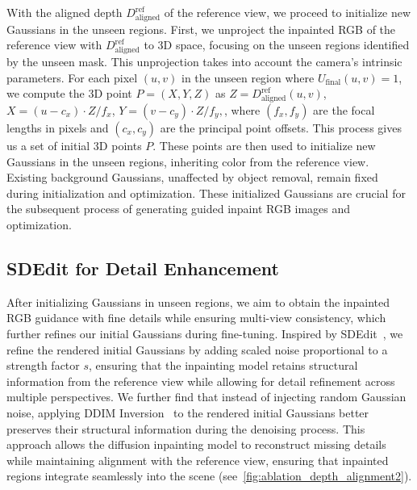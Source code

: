 \vspace{2pt}
With the aligned depth $D_\text{aligned}^{\text{ref}}$ of the reference view, we proceed to initialize new Gaussians in the unseen regions. First, we unproject the inpainted RGB of the reference view with $D_\text{aligned}^\text{ref}$ to 3D space, focusing on the unseen regions identified by the unseen mask. This unprojection takes into account the camera's intrinsic parameters. For each pixel $(u, v)$ in the unseen region where $U_\text{final}(u, v) = 1$, we compute the 3D point $P = (X, Y, Z)$ as $Z = D_\text{aligned}^\text{ref}(u, v)$, $X = (u - c_x) \cdot Z / f_x$, $Y = (v - c_y) \cdot Z / f_y,$,
where $(f_x, f_y)$ are the focal lengths in pixels and $(c_x, c_y)$ are the principal point offsets. This process gives us a set of initial 3D points $P$. These points are then used to initialize new Gaussians in the unseen regions, inheriting color from the reference view. Existing background Gaussians, unaffected by object removal, remain fixed during initialization and optimization. These initialized Gaussians are crucial for the subsequent process of generating guided inpaint RGB images and optimization.



\subsection{SDEdit for Detail Enhancement}  
\label{sec:sdedit}  

After initializing Gaussians in unseen regions, we aim to obtain the inpainted RGB guidance with fine details while ensuring multi-view consistency, which further refines our initial Gaussians during fine-tuning. Inspired by SDEdit~\citep{meng2022sdedit}, we refine the rendered initial Gaussians by adding scaled noise proportional to a strength factor \( s \), ensuring that the inpainting model retains structural information from the reference view while allowing for detail refinement across multiple perspectives. We further find that instead of injecting random Gaussian noise, applying DDIM Inversion~\cite{song2020denoising} to the rendered initial Gaussians better preserves their structural information during the denoising process. This approach allows the diffusion inpainting model to reconstruct missing details while maintaining alignment with the reference view, ensuring that inpainted regions integrate seamlessly into the scene (see~\cref{fig:ablation_depth_alignment2}).  
 

